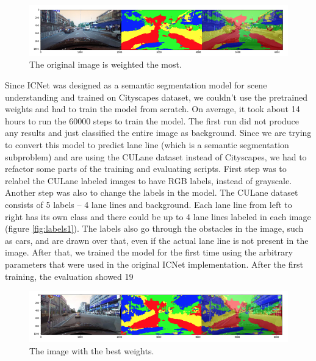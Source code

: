 \documentclass[twoside,twocolumn]{article}
\begin{document}
\begin{figure}
  \includegraphics[width=\linewidth]{4.png}
  \caption{The original image is weighted the most.}
  \label{fig:weights3}
\end{figure}

\par Since ICNet was designed as a semantic segmentation model for scene understanding and trained on Cityscapes dataset, we couldn't use the pretrained weights and had to train the model from scratch. On average, it took about 14 hours to run the 60000 steps to train the model. The first run did not produce any results and just classified the entire image as background. Since we are trying to convert this model to predict lane line (which is a semantic segmentation subproblem) and are using the CULane dataset instead of Cityscapes, we had to refactor some parts of the training and evaluating scripts. First step was to relabel the CULane labeled images to have RGB labels, instead of grayscale. Another step was also to change the labels in the model. The CULane dataset consists of 5 labels -- 4 lane lines and background. Each lane line from left to right has its own class and there could be up to 4 lane lines labeled in each image (figure \ref{fig:labels1}). The labels also go through the obstacles in the image, such as cars, and are drawn over that, even if the actual lane line is not present in the image.  After that, we trained the model for the first time using the arbitrary parameters that were used in the original ICNet implementation. After the first training, the evaluation showed 19%


\begin{figure}
  \includegraphics[width=\linewidth]{5.png}
  \caption{The image with the best weights.}
  \label{fig:best}
\end{figure}
\end{document}
